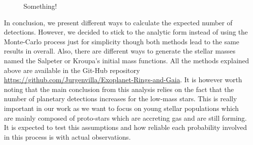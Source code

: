 \begin{figure}[!ht]
\centering
\caption{\scriptsize{Something!}}
\label{fig:Rings_Prob}
\end{figure}

In conclusion, we present different ways to calculate the expected number of detections. However, we decided to stick to the analytic form instead of using the Monte-Carlo process just for simplicity though both methods lead to the same results in overall. Also, there are different ways to generate the stellar masses named the Salpeter or Kroupa's initial mass functions. All the methods explained above are available in the Git-Hub repository \url{https://github.com/Jurgenvilla/Exoplanet-Rings-and-Gaia}. It is however worth noting that the main conclusion from this analysis relies on the fact that the number of planetary detections increases for the low-mass stars. This is really important in our work as we want to focus on young stellar populations which are mainly composed of proto-stars which are accreting gas and are still forming. It is expected to test this assumptions and how reliable each probability involved in this process is with actual observations. 
